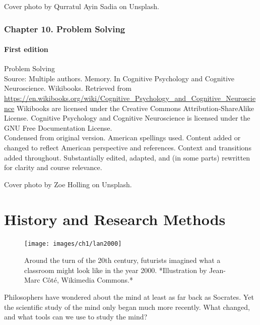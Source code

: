 \documentclass[
]{krantz}
\begin{document}
Cover photo by Qurratul Ayin Sadia on Unsplash.

\hypertarget{chapter-10.-problem-solving}{%
\subsection*{Chapter 10. Problem Solving}\label{chapter-10.-problem-solving}}


\hypertarget{first-edition-10}{%
\subsubsection*{First edition}\label{first-edition-10}}


Problem Solving\\
Source: Multiple authors. Memory. In Cognitive Psychology and Cognitive Neuroscience. Wikibooks. Retrieved from \url{https://en.wikibooks.org/wiki/Cognitive_Psychology_and_Cognitive_Neuroscience}
Wikibooks are licensed under the Creative Commons Attribution-ShareAlike License.
Cognitive Psychology and Cognitive Neuroscience is licensed under the GNU Free Documentation License.\\
Condensed from original version. American spellings used. Content added or changed to reflect American perspective and references. Context and transitions added throughout. Substantially edited, adapted, and (in some parts) rewritten for clarity and course relevance.

Cover photo by Zoe Holling on Unsplash.

\hypertarget{history-and-research-methods}{%
\chapter{History and Research Methods}\label{history-and-research-methods}}

\begin{figure}

{\centering \texttt{[image: images/ch1/lan2000]} 

}

\caption{Around the turn of the 20th century, futurists imagined what a classroom might look like in the year 2000. *Illustration by Jean-Marc Côté, Wikimedia Commons.*}\label{fig:lan2000}
\end{figure}

Philosophers have wondered about the mind at least as far back as Socrates. Yet the scientific study of the mind only began much more recently. What changed, and what tools can we use to study the mind?
\end{document}
